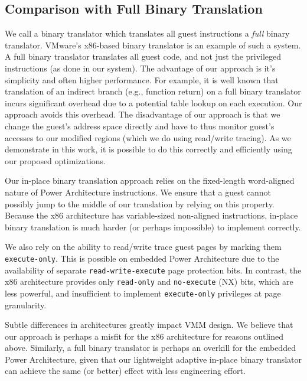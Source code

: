 \documentclass[10pt,twocolumn]{article}
\begin{document}
\subsection{Comparison with Full Binary Translation}
\label{sec:comparison_with_vmware}
We call a binary translator which translates all guest instructions a {\em full}
binary translator.
VMware's x86-based binary translator\cite{agesen:comparison} is an example of
such a system. A full binary translator translates all guest code, and not
just the privileged instructions (as done in our system). The advantage of
our approach is it's simplicity and often higher performance.
For example, it is well known that translation of an indirect branch (e.g., function
return)
on a full binary translator incurs significant overhead due to a potential
table lookup on each execution. Our approach avoids this overhead.
The disadvantage of our approach is that we change the guest's address space
directly and have to thus monitor guest's accesses to our modified regions
(which we do using read/write tracing). As we demonstrate in this work, it is
possible to do this correctly and efficiently using our proposed optimizations.

Our in-place binary translation approach relies on the fixed-length word-aligned
nature of Power Architecture instructions. We ensure that a guest cannot possibly
jump to the middle of our translation by relying on this property. Because the
x86 architecture has variable-sized non-aligned instructions, in-place binary
translation is much harder (or perhaps impossible) to implement correctly.

We also rely on the ability to read/write trace guest pages by marking them
{\tt execute-only}. This is possible on embedded Power Architecture due to the
availability of separate
{\tt read-write-execute} page protection bits.
In contrast, the x86 architecture provides only {\tt read-only} and
{\tt no-execute} (NX) bits, which are less powerful, and insufficient
to implement {\tt execute-only} privileges at page granularity.

Subtle
differences in architectures greatly impact VMM design. We believe that our
approach is perhaps a misfit for the x86 architecture for reasons outlined above.
Similarly, a full binary translator is perhaps an overkill for the embedded
Power Architecture, given that our lightweight adaptive in-place binary translator
can achieve the same (or better) effect with less engineering effort.
\end{document}
